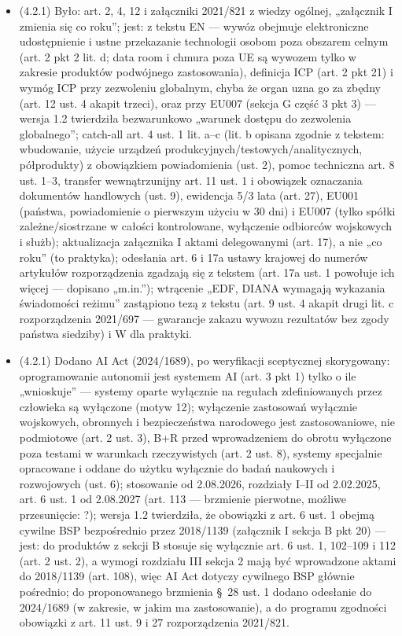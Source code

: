 \documentclass[12pt,a4paper]{report}
\begin{document}
\begin{itemize}
  \item (4.2.1) Było: art. 2, 4, 12 i załączniki 2021/821 z wiedzy ogólnej, „załącznik I zmienia się co roku”; jest: z tekstu EN --- wywóz obejmuje elektroniczne udostępnienie i ustne przekazanie technologii osobom poza obszarem celnym (art. 2 pkt 2 lit. d; data room i chmura poza UE są wywozem tylko w zakresie produktów podwójnego zastosowania), definicja ICP (art. 2 pkt 21) i wymóg ICP przy zezwoleniu globalnym, chyba że organ uzna go za zbędny (art. 12 ust. 4 akapit trzeci), oraz przy EU007 (sekcja G część 3 pkt 3) --- wersja 1.2 twierdziła bezwarunkowo „warunek dostępu do zezwolenia globalnego”; catch-all art. 4 ust. 1 lit. a--c (lit. b opisana zgodnie z tekstem: wbudowanie, użycie urządzeń produkcyjnych/testowych/analitycznych, półprodukty) z obowiązkiem powiadomienia (ust. 2), pomoc techniczna art. 8 ust. 1--3, transfer wewnątrzunijny art. 11 ust. 1 i obowiązek oznaczania dokumentów handlowych (ust. 9), ewidencja 5/3 lata (art. 27), EU001 (państwa, powiadomienie o pierwszym użyciu w 30 dni) i EU007 (tylko spółki zależne/siostrzane w całości kontrolowane, wyłączenie odbiorców wojskowych i służb); aktualizacja załącznika I aktami delegowanymi (art. 17), a nie „co roku” (to praktyka); odesłania art. 6 i 17a ustawy krajowej do numerów artykułów rozporządzenia zgadzają się z tekstem (art. 17a ust. 1 powołuje ich więcej --- dopisano „m.in.”); wtrącenie „EDF, DIANA wymagają wykazania świadomości reżimu” zastąpiono tezą z tekstu (art. 9 ust. 4 akapit drugi lit. c rozporządzenia 2021/697 --- gwarancje zakazu wywozu rezultatów bez zgody państwa siedziby) i W dla praktyki.
  \item (4.2.1) Dodano AI Act (2024/1689), po weryfikacji sceptycznej skorygowany: oprogramowanie autonomii jest systemem AI (art. 3 pkt 1) tylko o ile „wnioskuje” --- systemy oparte wyłącznie na regułach zdefiniowanych przez człowieka są wyłączone (motyw 12); wyłączenie zastosowań wyłącznie wojskowych, obronnych i bezpieczeństwa narodowego jest zastosowaniowe, nie podmiotowe (art. 2 ust. 3), B+R przed wprowadzeniem do obrotu wyłączone poza testami w warunkach rzeczywistych (art. 2 ust. 8), systemy specjalnie opracowane i oddane do użytku wyłącznie do badań naukowych i rozwojowych (ust. 6); stosowanie od 2.08.2026, rozdziały I--II od 2.02.2025, art. 6 ust. 1 od 2.08.2027 (art. 113 --- brzmienie pierwotne, możliwe przesunięcie: ?); wersja 1.2 twierdziła, że obowiązki z art. 6 ust. 1 obejmą cywilne BSP bezpośrednio przez 2018/1139 (załącznik I sekcja B pkt 20) --- jest: do produktów z sekcji B stosuje się wyłącznie art. 6 ust. 1, 102--109 i 112 (art. 2 ust. 2), a wymogi rozdziału III sekcja 2 mają być wprowadzone aktami do 2018/1139 (art. 108), więc AI Act dotyczy cywilnego BSP głównie pośrednio; do proponowanego brzmienia §~28 ust. 1 dodano odesłanie do 2024/1689 (w zakresie, w jakim ma zastosowanie), a do programu zgodności obowiązki z art. 11 ust. 9 i 27 rozporządzenia 2021/821.

\end{itemize}
\end{document}
